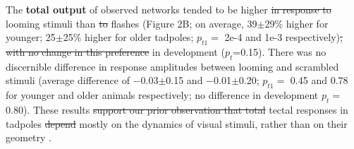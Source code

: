 \documentclass{article}
\providecommand{\DIFaddtex}[1]{{\protect\color{blue}{#1}}} %
\providecommand{\DIFdeltex}[1]{{\protect\color{red}\sout{#1}}}                      %
\providecommand{\DIFaddbegin}{} %
\providecommand{\DIFaddend}{} %
\providecommand{\DIFdelbegin}{} %
\providecommand{\DIFdelend}{} %
\providecommand{\DIFadd}[1]{\texorpdfstring{\DIFaddtex{#1}}{#1}} %
\providecommand{\DIFdel}[1]{\texorpdfstring{\DIFdeltex{#1}}{}} %
\newcommand{\DIFscaledelfig}{0.5}
\newlength{\DIFdelgraphicswidth} %
\newlength{\DIFdelgraphicsheight} %
\newcommand{\DIFaddincludegraphics}[2][]{{\color{blue}\fbox{\DIFOincludegraphics[#1]{#2}}}} %
\newcommand{\DIFdelincludegraphics}[2][]{%
\sbox{\DIFdelgraphicsbox}{\DIFOincludegraphics[#1]{#2}}%
\settoboxwidth{\DIFdelgraphicswidth}{\DIFdelgraphicsbox} %
\settoboxtotalheight{\DIFdelgraphicsheight}{\DIFdelgraphicsbox} %
\scalebox{\DIFscaledelfig}{%
\parbox[b]{\DIFdelgraphicswidth}{\usebox{\DIFdelgraphicsbox}\\[-\baselineskip] \rule{\DIFdelgraphicswidth}{0em}}\llap{\resizebox{\DIFdelgraphicswidth}{\DIFdelgraphicsheight}{%
\setlength{\unitlength}{\DIFdelgraphicswidth}%
\begin{picture}(1,1)%
\thicklines\linethickness{2pt} %
{\color[rgb]{1,0,0}\put(0,0){\framebox(1,1){}}}%
{\color[rgb]{1,0,0}\put(0,0){\line( 1,1){1}}}%
{\color[rgb]{1,0,0}\put(0,1){\line(1,-1){1}}}%
\end{picture}%
}\hspace*{3pt}}} %
} %
\DeclareRobustCommand{\DIFaddbegin}{\DIFOaddbegin \let\includegraphics\DIFaddincludegraphics} %
\DeclareRobustCommand{\DIFaddend}{\DIFOaddend \let\includegraphics\DIFOincludegraphics} %
\DeclareRobustCommand{\DIFdelbegin}{\DIFOdelbegin \let\includegraphics\DIFdelincludegraphics} %
\DeclareRobustCommand{\DIFdelend}{\DIFOaddend \let\includegraphics\DIFOincludegraphics} %
\begin{document}
The \textbf{total \DIFaddbegin \DIFadd{spiking }\DIFaddend output} of observed networks \DIFaddbegin \DIFadd{(the sum of all spikes of all neurons during a visual response) }\DIFaddend tended to be higher \DIFdelbegin \DIFdel{in response to }\DIFdelend \DIFaddbegin \DIFadd{for }\DIFaddend looming stimuli than \DIFdelbegin \DIFdel{to }\DIFdelend \DIFaddbegin \DIFadd{for }\DIFaddend flashes (Figure 2B; on average, 39$\pm$29\% higher for younger; 25$\pm$25\% higher for older tadpoles; $p_{t1}=$ 2e-4 and 1e-3 respectively)\DIFdelbegin \DIFdel{, with no change in this preference }\DIFdelend \DIFaddbegin \DIFadd{; this preference did not change }\DIFaddend in development ($p_t$=0.15). There was no discernible difference in response amplitudes between looming and scrambled stimuli (average difference of $-$0.03$\pm$0.15 and $-$0.01$\pm$0.20; $p_{t1}=$ 0.45 and 0.78 for younger and older animals respectively; no difference in development $p_t=$ 0.80). These results \DIFdelbegin \DIFdel{support our prior observation that total }\DIFdelend \DIFaddbegin \DIFadd{match our prior reports that the overall strength of }\DIFaddend tectal responses in tadpoles \DIFdelbegin \DIFdel{depend }\DIFdelend \DIFaddbegin \DIFadd{depends }\DIFaddend mostly on the dynamics of visual stimuli, rather than on their geometry \citep{khakhalin2014, jang2016}.
\end{document}
